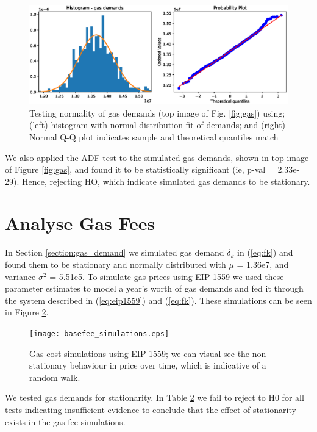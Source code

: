 \documentclass[futureinternet,article,submit,moreauthors,dvi2pdf]{mdpi}
\begin{document}
\begin{figure}
\centering
\includegraphics[width=12 cm]{gaussian_analysis.eps}
\caption{Testing normality of gas demands (top image of Fig. \ref{fig:gas}) using; (left) histogram with normal distribution fit of demands; and (right) Normal Q-Q plot indicates sample and theoretical quantiles match} 
\label{fig:eda}
\end{figure} 

We also applied the ADF test to the simulated gas demands, shown in top image of Figure \ref{fig:gas}, and found it to be statistically significant (ie, p-val = 2.33e-29). Hence, rejecting HO, which indicate simulated gas demands to be stationary. 

\section{Analyse Gas Fees}
\label{section:gas_fees}

In Section \ref{section:gas_demand} we simulated gas demand  $\delta_{k}$ in (\ref{eq:fk}) and found them to be stationary and normally distributed with $\mu$ = 1.36e7, and variance $\sigma^2$ = 5.51e5. To simulate gas prices using EIP-1559 we used these parameter estimates to model a year's worth of gas demands and fed it through the system described in (\ref{eq:eip1559}) and (\ref{eq:fk}). These simulations can be seen in Figure \ref{fig:basefee_simulations}.

\begin{figure}
\centering
\texttt{[image: basefee\_simulations.eps]}
\caption{Gas cost simulations using EIP-1559; we can visual see the non-stationary behaviour in price over time, which is indicative of a random walk.}  
\label{fig:basefee_simulations}
\end{figure} 

We tested gas demands for stationarity. In Table \ref{fig:basefee_simulations} we fail to reject to H0 for all tests indicating insufficient evidence to conclude that the effect of stationarity exists in the gas fee simulations. 
 
\end{document}
